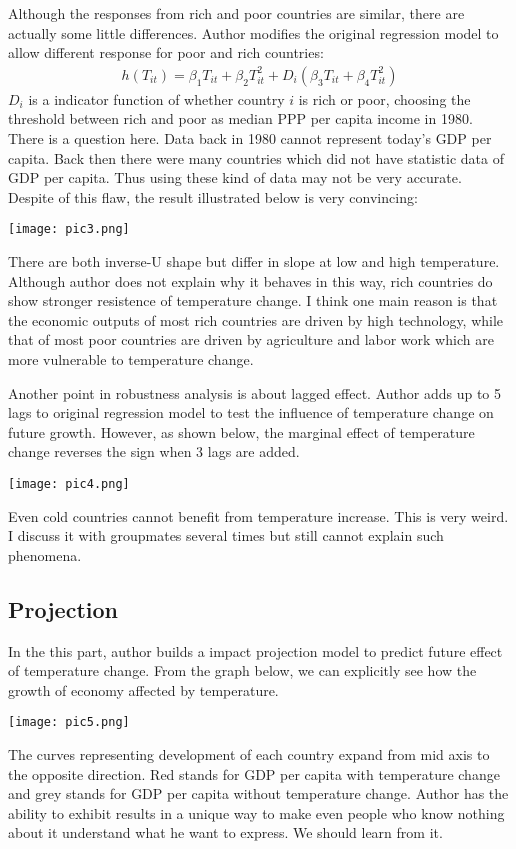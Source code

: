 \documentclass[letterpaper]{article}
\begin{document}
Although the responses from rich and poor countries are similar, there are actually some little differences. Author modifies the original regression model to allow different response for poor and rich countries:
\begin{eqnarray}
  h(T_{it}) = \beta_1T_{it} + \beta_2T_{it}^2 + D_i(\beta_3T_{it} + \beta_4T_{it}^2)
\end{eqnarray}
$D_i$ is a indicator function of whether country $i$ is rich or poor, choosing the threshold between rich and poor as median PPP per capita income in 1980. There is a question here. Data back in 1980 cannot represent today's GDP per capita. Back then there were many countries which did not have statistic data of GDP per capita. Thus using these kind of data may not be very accurate. Despite of this flaw, the result illustrated below is very convincing:
\begin{center}
  \texttt{[image: pic3.png]}
\end{center}
There are both inverse-U shape but differ in slope at low and high temperature. Although author does not explain why it behaves in this way, rich countries do show stronger resistence of temperature change. I think one main reason is that the economic outputs of most rich countries are driven by high technology, while that of most poor countries are driven by agriculture and labor work which are more vulnerable to temperature change. 

Another point in robustness analysis is about lagged effect. Author adds up to 5 lags to original regression model to test the influence of temperature change on future growth. However, as shown below, the marginal effect of temperature change reverses the sign when 3 lags are added.
\begin{center}
  \texttt{[image: pic4.png]}
\end{center}
Even cold countries cannot benefit from temperature increase. This is very weird. I discuss it with groupmates several times but still cannot explain such phenomena.

\subsection{Projection}

In the this part, author builds a impact projection model to predict future effect of temperature change. From the graph below, we can explicitly see how the growth of economy affected by temperature.
\begin{center}
  \texttt{[image: pic5.png]}
\end{center}
The curves representing development of each country expand from mid axis to the opposite direction. Red stands for GDP per capita with temperature change and grey stands for GDP per capita without temperature change. Author has the ability to exhibit results in a unique way to make even people who know nothing about it understand what he want to express. We should learn from it.
\end{document}
